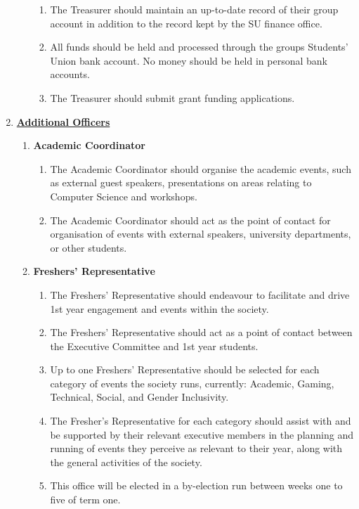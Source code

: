 \documentclass{article}
\begin{document}
\begin{enumerate}
\begin{enumerate}
\begin{enumerate}
            \item The Treasurer should maintain an up-to-date record of their group account in addition to the record kept by the SU finance office.
            \item All funds should be held and processed through the groups Students' Union bank account. No money should be held in personal bank accounts.
            \item The Treasurer should submit grant funding applications.
        \end{enumerate}
    \end{enumerate}
    \item \textbf{\underline{Additional Officers}}
    \begin{enumerate}
        \item \textbf{Academic Coordinator}
        \begin{enumerate}
            \item The Academic Coordinator should organise the academic events, such as external guest speakers, presentations on areas relating to Computer Science and workshops.
            \item The Academic Coordinator should act as the point of contact for organisation of events with external speakers, university departments, or other students.
        \end{enumerate}
        \item \textbf{Freshers' Representative}
        \begin{enumerate}
            \item The Freshers' Representative should endeavour to facilitate and drive 1st year engagement and events within the society.
            \item The Freshers' Representative should act as a point of contact between the Executive Committee and 1st year students.
            \item Up to one Freshers' Representative should be selected for each category of events the society runs, currently: Academic, Gaming, Technical, Social, and Gender Inclusivity. 
            \item The Fresher's Representative for each category should assist with and be supported by their relevant executive members in the planning and running of events they perceive as relevant to their year, along with the general activities of the society.
            \item This office will be elected in a by-election run between weeks one to five of term one.

\end{enumerate}
\end{enumerate}
\end{enumerate}
\end{document}
